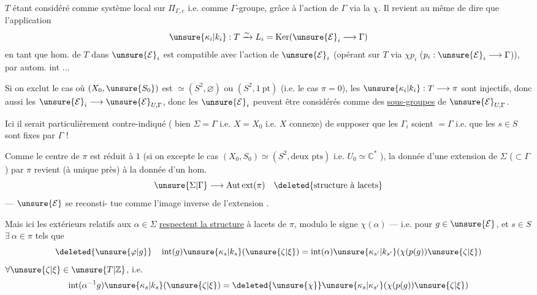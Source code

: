 
$T$ étant considéré comme système local
sur $\Pi_{\Gamma,e}$  i.e. comme $\Gamma$-groupe, grâce à l'action
de $\Gamma$ via la  $\chi$. Il revient au
même de dire que  l'application
\[
\unsure{\kappa_i|k_i}:T\xrightarrow{\sim}L_i=\operatorname{Ker}(\unsure{\mathcal E}_i\longrightarrow\Gamma)
\]
en tant que hom. de $T$ dans $\unsure{\mathcal E}_i$ est
compatible avec l'action de $\unsure{\mathcal E}_i$ (opérant
sur $T$ via $\chi p_i$ ($p_i:\unsure{\mathcal E}_i\longrightarrow\Gamma$)), 
 par autom. int ...

Si on exclut le cas où $(X_0,\unsure{S_0})$
est $\simeq(S^2,\varnothing)$ ou $(S^2,1\ \mathrm{pt})$ (i.e.
le cas $\pi=0$), les $\unsure{\kappa_i|k_i}:T\longrightarrow\pi$ sont injectifs,
donc aussi les $\unsure{\mathcal E}_i\longrightarrow\unsure{\mathcal E}_{U,\Gamma}$, donc les
$\unsure{\mathcal E}_i$ peuvent être considérés comme des
\uline{sous-groupes} de $\unsure{\mathcal E}_{U,\Gamma}$.

\unsure{\S} Ici il  serait particulièrement
contre-indiqué ( bien  $\Sigma=\Gamma$ i.e.
$X=X_0$ i.e. $X$ connexe) de supposer que
les $\Gamma_i$ soient $=\Gamma$ i.e. que les $s\in S$ sont fixes
par $\Gamma$ !


Comme le centre de $\pi$ est réduit à $1$
(si on excepte  le cas $(X_0,S_0)\simeq(S^2,\text{deux pts})$
i.e. $U_0\simeq\mathbb C^*$ ), la donnée d'une extension
de $\Sigma$ ($\subset\Gamma$) par $\pi$ revient (à  unique
près) à la donnée d'un hom.
\[
\unsure{\Sigma|\Gamma}\longrightarrow\mathrm{Aut\,ext}(\pi)\quad\deleted{\text{structure à lacets}}
\]
 --- $\unsure{\mathcal E}$ se reconsti-
tue comme l'image inverse de l'extension
.

Mais ici les  extérieurs relatifs
aux $\alpha\in\Sigma$  \uline{respectent la structure}
à lacets  de $\pi$, modulo le
signe $\chi(\alpha)$ --- i.e. pour $g\in\unsure{\mathcal E}$, et $s\in S$
$\exists\ \alpha\in\pi$  tels que
\[
\deleted{\unsure{\varphi|g}}\quad
\operatorname{int}(g)\unsure{\kappa_s|k_s}(\unsure{\zeta|\xi})
=\operatorname{int}(\alpha)\unsure{\kappa_{s'}|k_{s'}}(\chi(p(g))\unsure{\zeta|\xi})
\]
$\forall\unsure{\zeta|\xi}\in\unsure{T|\mathbb Z}$, i.e.
\[
\operatorname{int}(\alpha^{-1}g)\unsure{\kappa_s|k_s}(\unsure{\zeta|\xi})
=\deleted{\unsure{\chi}}\unsure{\kappa_s|\kappa_{s'}}(\chi(p(g))\unsure{\zeta|\xi})
\]

